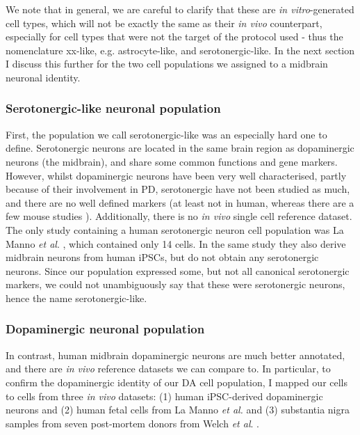 We note that in general, we are careful to clarify that these are \textit{in vitro}-generated cell types, which will not be exactly the same as their \textit{in vivo} counterpart, especially for cell types that were not the target of the protocol used - thus the nomenclature xx-like, e.g. astrocyte-like, and serotonergic-like.
In the next section I discuss this further for the two cell populations we assigned to a midbrain neuronal identity.

\subsubsection{Serotonergic-like neuronal population}

First, the population we call serotonergic-like was an especially hard one to define.
Serotonergic neurons are located in the same brain region as dopaminergic neurons 
(the midbrain),
and share some common functions and gene markers.
However, whilst dopaminergic neurons have been very well characterised, partly because of their involvement in PD, serotonergic have not been studied as much, and there are no well defined markers (at least not in human, whereas there are a few mouse studies \cite{cummings2019serotonergic}).
Additionally, there is no \textit{in vivo} single cell reference dataset.
The only study containing a human serotonergic neuron cell population was La Manno \textit{et al}. \cite{la2016molecular}, which contained only 14 cells.
In the same study they also derive midbrain neurons from human iPSCs, but do not obtain any serotonergic neurons.
Since our population expressed some, but not all canonical serotonergic markers, 
we could not unambiguously say that these were serotonergic neurons, hence the name serotonergic-like.

\subsubsection{Dopaminergic neuronal population}

In contrast, human midbrain dopaminergic neurons are much better annotated, and there are \textit{in vivo} reference datasets we can compare to.
In particular, to confirm the dopaminergic identity of our DA cell population, I mapped our cells to cells from three \textit{in vivo} datasets:
(1) human iPSC-derived dopaminergic neurons and (2) human fetal cells from La Manno \textit{et al.} \cite{la2016molecular} and (3) substantia nigra samples from seven post-mortem donors from Welch \textit{et al}. \cite{welch2019single}. \\


